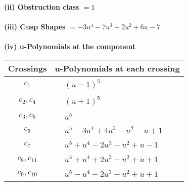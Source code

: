 \documentclass[1p]{elsarticle_modified}
\theoremstyle{definition}
\begin{document}
\flushleft \textbf{(ii) Obstruction class $= 1$}\\~\\
\flushleft \textbf{(iii) Cusp Shapes $= -3 u^4-7 u^3+2 u^2+6 u-7$}\\~\\
\newpage\renewcommand{\arraystretch}{1}
\flushleft \textbf{(iv) u-Polynomials at the component}\newline \\
\begin{tabular}{m{50pt}|m{274pt}}
Crossings & \hspace{64pt}u-Polynomials at each crossing \\
\hline $$\begin{aligned}c_{1}\end{aligned}$$&$\begin{aligned}
&(u-1)^5
\end{aligned}$\\
\hline $$\begin{aligned}c_{2},c_{4}\end{aligned}$$&$\begin{aligned}
&(u+1)^5
\end{aligned}$\\
\hline $$\begin{aligned}c_{3},c_{6}\end{aligned}$$&$\begin{aligned}
&u^5
\end{aligned}$\\
\hline $$\begin{aligned}c_{5}\end{aligned}$$&$\begin{aligned}
&u^5-3 u^4+4 u^3- u^2- u+1
\end{aligned}$\\
\hline $$\begin{aligned}c_{7}\end{aligned}$$&$\begin{aligned}
&u^5+u^4-2 u^3- u^2+u-1
\end{aligned}$\\
\hline $$\begin{aligned}c_{8},c_{11}\end{aligned}$$&$\begin{aligned}
&u^5+u^4+2 u^3+u^2+u+1
\end{aligned}$\\
\hline $$\begin{aligned}c_{9},c_{10}\end{aligned}$$&$\begin{aligned}
&u^5- u^4-2 u^3+u^2+u+1
\end{aligned}$\\
\hline
\end{tabular}\\~\\
\end{document}
